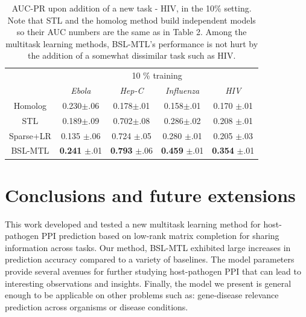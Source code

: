 \documentclass{bioinfo}
\begin{document}
\begin{table}[h]\caption{AUC-PR upon addition of a new task - HIV, in the 10\% setting. Note that STL and the homolog method build independent models so their AUC numbers are the same as in Table 2. Among the multitask learning methods, BSL-MTL's performance is not hurt by the addition of a somewhat dissimilar task such as HIV.}
\label{hivresults}
\begin{small}
\begin{center}
\begin{tabular}{c|cccc}
\toprule
& \multicolumn{4}{c}{10 \% training } \\
& \textit{Ebola} & \textit{Hep-C} & \textit{Influenza} & \textit{HIV} \\ \midrule
Homolog & 0.230$\pm$.06 & 0.178$\pm$.01 & 0.158$\pm$.01 & 0.170 $\pm$.01 \\
STL  & 0.189$\pm$.09 & 0.702$\pm$.08 & 0.286$\pm$.02  & 0.208 $\pm$.01 \\ 
Sparse+LR & 0.135 $\pm$.06 & 0.724 $\pm$.05 & 0.280 $\pm$.01 & 0.205 $\pm$.03  \\ 
BSL-MTL & \textbf{0.241} $\pm$.01 & \textbf{0.793} $\pm$.06 & \textbf{0.459} $\pm$.01 & \textbf{0.354} $\pm$.01  \\ \bottomrule
\end{tabular}
\end{center}
\end{small}
\end{table}



\section{Conclusions and future extensions}
This work developed and tested a new multitask learning method for host-pathogen PPI prediction based on low-rank matrix completion for sharing information across tasks. Our method, BSL-MTL exhibited large increases in prediction accuracy compared to a variety of baselines.
The model parameters provide several avenues for further studying host-pathogen PPI that can lead to interesting observations and insights. Finally, the model we present is general enough to be applicable on other problems such as: gene-disease relevance prediction across organisms or disease conditions. 





%



\begin{scriptsize}

\end{scriptsize}
\end{document}
